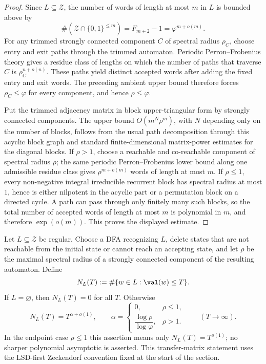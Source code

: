 \begin{proof}
  Since \(L\subseteq\mathcal Z\), the number of words of length at most
  \(m\) in \(L\) is bounded above by
  \[
    \#(\mathcal Z\cap\{0,1\}^{\le m})=F_{m+2}-1=\varphi^{m+o(m)}.
  \]
  For any trimmed strongly connected component \(C\) of spectral radius
  \(\rho_C\), choose entry and exit paths through the trimmed automaton.
  Periodic Perron--Frobenius theory gives a residue class of lengths on
  which the number of paths that traverse \(C\) is
  \(\rho_C^{n+o(n)}\). These paths yield distinct accepted words after
  adding the fixed entry and exit words. The preceding ambient upper
  bound therefore forces \(\rho_C\le\varphi\) for every component, and
  hence \(\rho\le\varphi\).

  Put the trimmed adjacency matrix in block upper-triangular form by
  strongly connected components. The upper bound
  \(O(m^N\rho^m)\), with \(N\) depending only on the number of blocks,
  follows from the usual path decomposition through this acyclic block
  graph and standard finite-dimensional matrix-power estimates for the
  diagonal blocks. If
  \(\rho>1\), choose a reachable and co-reachable component of spectral
  radius \(\rho\); the same periodic Perron--Frobenius lower bound along
  one admissible residue class gives \(\rho^{m+o(m)}\) words of length at
  most \(m\). If \(\rho\le1\), every non-negative integral irreducible
  recurrent block has spectral radius at most \(1\), hence is either
  nilpotent in the acyclic part or a permutation block on a directed
  cycle. A path can pass through only finitely many such blocks, so the
  total number of accepted words of length at most \(m\) is polynomial in
  \(m\), and therefore \(\exp(o(m))\). This proves the displayed
  estimate.
\end{proof}

\begin{proposition}
  \label{prop:zeckendorf-regular-powerlaw}
  Let \(L\subseteq\mathcal Z\) be regular. Choose a DFA recognizing
  \(L\), delete states that are not reachable from the initial state or
  cannot reach an accepting state, and let \(\rho\) be the maximal
  spectral radius of a strongly connected component of the resulting
  automaton. Define
  \[
    N_L(T):=\#\{w\in L:\val(w)\le T\}.
  \]
  If \(L=\varnothing\), then \(N_L(T)=0\) for all \(T\). Otherwise
  \[
    N_L(T)=T^{\alpha+o(1)},
    \qquad
    \alpha=
    \begin{cases}
      0, & \rho\le 1,\\[0.3em]
      \dfrac{\log \rho}{\log \varphi}, & \rho>1.
    \end{cases}
    \qquad (T\to\infty).
  \]
  In the endpoint case \(\rho\le1\) this assertion means only
  \(N_L(T)=T^{o(1)}\); no sharper polynomial asymptotic is asserted.
  This transfer-matrix statement uses the LSD-first Zeckendorf convention
  fixed at the start of the section.
\end{proposition}

